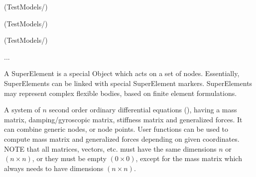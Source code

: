 \item {} (TestModels/)
\item {} (TestModels/)
\item {} (TestModels/)
\item  ...


\ei

%

\newpage
A SuperElement is a special Object which acts on a set of nodes. Essentially, SuperElements can be linked with special SuperElement markers. SuperElements may represent complex flexible bodies, based on finite element formulations.


\label{sec:item:ObjectGenericODE2}
A system of $n$ second order ordinary differential equations (), having a mass matrix, damping/gyroscopic matrix, stiffness matrix and generalized forces. It can combine generic nodes, or node points. User functions can be used to compute mass matrix and generalized forces depending on given coordinates. NOTE that all matrices, vectors, etc. must have the same dimensions $n$ or $(n \times n)$, or they must be empty $(0 \times 0)$, except for the mass matrix which always needs to have dimensions $(n \times n)$.
\vspace{12pt}\\


